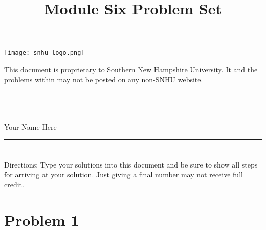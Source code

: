 \documentclass{amsart}
\theoremstyle{definition}
\theoremstyle{Exercise}
\theoremstyle{remark}
\theoremstyle{rule}
\numberwithin{equation}{section}
\begin{document}
\begin{center}
\texttt{[image: snhu\_logo.png]}
\end{center}
\title{\sf Module Six Problem Set}%



\maketitle
This document is proprietary to Southern New Hampshire University. It and the problems within may not be posted on any non-SNHU website.
\\\\\\\\
\begin{center}
Your Name Here
\end{center}


\begin{center}
\rule{\textwidth}{0.4pt}
\end{center}
\newpage


\section*{}
\section*{}
Directions: Type your solutions into this document and be sure to show all steps for arriving at your solution. Just giving a final number may not receive full credit.
\\


\section*{Problem 1}
\end{document}
